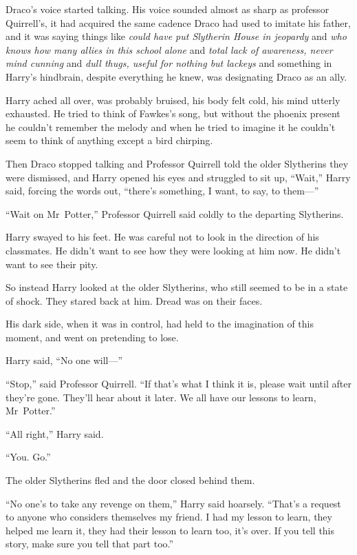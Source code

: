 Draco’s voice started talking. His voice sounded almost as sharp as professor Quirrell’s, it had acquired the same cadence Draco had used to imitate his father, and it was saying things like \emph{could have put Slytherin House in jeopardy} and \emph{who knows how many allies in this school alone} and \emph{total lack of awareness, never mind cunning} and \emph{dull thugs, useful for nothing but lackeys} and something in Harry’s hindbrain, despite everything he knew, was designating Draco as an ally.

Harry ached all over, was probably bruised, his body felt cold, his mind utterly exhausted. He tried to think of Fawkes’s song, but without the phoenix present he couldn’t remember the melody and when he tried to imagine it he couldn’t seem to think of anything except a bird chirping.

Then Draco stopped talking and Professor Quirrell told the older Slytherins they were dismissed, and Harry opened his eyes and struggled to sit up, “Wait,” Harry said, forcing the words out, “there’s something, I want, to say, to them—”

“Wait on Mr~Potter,” Professor Quirrell said coldly to the departing Slytherins.

Harry swayed to his feet. He was careful not to look in the direction of his classmates. He didn’t want to see how they were looking at him now. He didn’t want to see their pity.

So instead Harry looked at the older Slytherins, who still seemed to be in a state of shock. They stared back at him. Dread was on their faces.

His dark side, when it was in control, had held to the imagination of this moment, and went on pretending to lose.

Harry said, “No one will—”

“Stop,” said Professor Quirrell. “If that’s what I think it is, please wait until after they’re gone. They’ll hear about it later. We all have our lessons to learn, Mr~Potter.”

“All right,” Harry said.

“You. Go.”

The older Slytherins fled and the door closed behind them.

“No one’s to take any revenge on them,” Harry said hoarsely. “That’s a request to anyone who considers themselves my friend. I had my lesson to learn, they helped me learn it, they had their lesson to learn too, it’s over. If you tell this story, make sure you tell that part too.”

